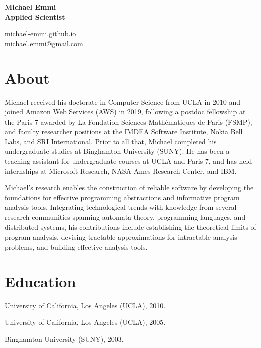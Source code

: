 \documentclass{article}
\begin{document}
  {\noindent\bfseries\Huge Michael Emmi} \\[1em]
  {\noindent\bfseries\Large Applied Scientist} \\[1em]
  \noindent
  \begin{minipage}[t]{0.5\linewidth}
  \end{minipage}
  \begin{minipage}[t]{0.5\linewidth}
    \href{https://michael-emmi.github.io}{%
    michael-emmi.github.io} \\
    \href{%
    mailto:michael.emmi@gmail.com}{%
    michael.emmi@gmail.com}
  \end{minipage}

  \section*{About}


    Michael received his doctorate in Computer Science from UCLA in 2010 and joined Amazon Web Services (AWS) in 2019, following a postdoc fellowship at the Paris 7 awarded by La Fondation Sciences Mathématiques de Paris (FSMP), and faculty researcher positions at the IMDEA Software Institute, Nokia Bell Labs, and SRI International. Prior to all that, Michael completed his undergraduate studies at Binghamton University (SUNY). He has been a teaching assistant for undergraduate courses at UCLA and Paris 7, and has held internships at Microsoft Research, NASA Ames Research Center, and IBM.


    Michael’s research enables the construction of reliable software by developing the foundations for effective programming abstractions and informative program analysis tools. Integrating technological trends with knowledge from several research communities spanning automata theory, programming languages, and distributed systems, his contributions include establishing the theoretical limits of program analysis, devising tractable approximations for intractable analysis problems, and building effective analysis tools.


  \section*{Education}

  \begin{description}[leftmargin=0cm]

    \item[Ph.D. Computer Science.] University of California, Los Angeles (UCLA), 2010.


    \item[M.S. Computer Science.] University of California, Los Angeles (UCLA), 2005.


    \item[B.S. Computer Science.] Binghamton University (SUNY), 2003.

  \end{description}
\end{document}
